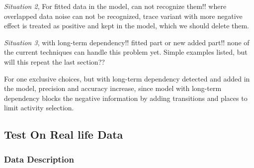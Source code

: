 \emph{Situation 2}, For fitted data in the model, can not recognize them!! where overlapped data noise can not be recognized, trace variant with more negative effect is treated as positive and kept in the model, which we should delete them.   

\emph{Situation 3}, with long-term dependency!! fitted part or new added part!! none of the current techniques can handle this problem yet.
Simple examples listed, but will this repeat the last section?? 


For one exclusive choices, 
but with long-term dependency detected and added in the model, precision and accuracy increase, since model with long-term dependency blocks the negative information by adding transitions and places to limit activity selection. 

\subsection{Test On Real life Data}
\subsubsection{Data Description}
